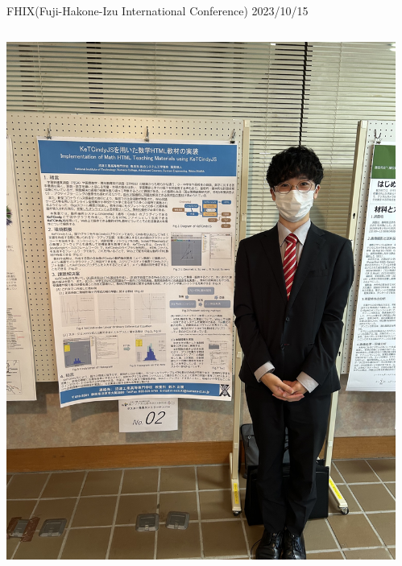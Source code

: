 \documentclass[dvipdfmx, unicode, 169]{beamer}
\begin{document}
\begin{frame}{FHIX(Fuji-Hakone-Izu International Conference) 2023/10/15}
  \begin{columns}[T]
    \begin{column}{0.5\linewidth}
      \centering
      \includegraphics[scale=0.05]{img/ActiveReport/20231015_p.png}
    \end{column}
    \begin{column}{0.5\linewidth}
      \centering

\end{column}
\end{columns}
\end{frame}
\end{document}

